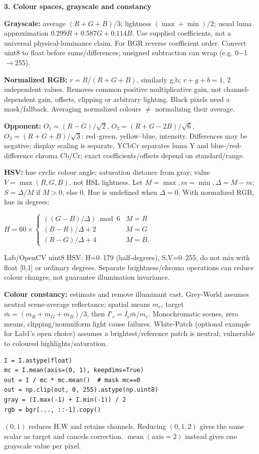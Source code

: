 \documentclass[a4paper]{article}
\newcommand{\key}[1]{\textbf{#1}}
\newcommand{\Topic}[1]{\par\vspace{1.7pt}\noindent
  {\fontsize{7.7}{8.0}\selectfont\bfseries #1}\par\vspace{0.3pt}}
\newcommand{\eq}[1]{\par\noindent\mbox{\(\displaystyle #1\)}\par}
\newcounter{sheet}
\newcounter{sheetcolumn}
\newlength{\colwidth}
\newenvironment{sheetcol}[1][7.0]{\stepcounter{sheetcolumn}
  \begin{lrbox}{\columnbox}\begin{minipage}[t]{\colwidth}\vspace{0pt}
  \fontsize{#1}{\dimexpr#1pt+0.6pt\relax}\selectfont}
  {\end{minipage}\end{lrbox}
  \typeout{CV1COL|\thesheet|\thesheetcolumn|\the\dimexpr\ht\columnbox+\dp\columnbox\relax}
  \usebox{\columnbox}\ignorespacesafterend}
\begin{document}
\begin{sheetcol}
\Topic{3. Colour spaces, grayscale and constancy}

\key{Grayscale:} average \((R+G+B)/3\); lightness \((\max+\min)/2\); usual luma approximation \(0.299R+0.587G+0.114B\). Use supplied coefficients, not a universal physical-luminance claim. For BGR reverse coefficient order. Convert uint8 to float before sums/differences; unsigned subtraction can wrap (e.g. 0\(-\)1\(\to\)255).

\key{Normalized RGB:} \(r=R/(R+G+B)\), similarly g,b; \(r+g+b=1\), 2 independent values. Removes common positive multiplicative gain, not channel-dependent gain, offsets, clipping or arbitrary lighting. Black pixels need a mask/fallback. Averaging normalized colours \(\ne\) normalizing their average.

\key{Opponent:} \(O_1=(R-G)/\sqrt2\), \(O_2=(R+G-2B)/\sqrt6\), \(O_3=(R+G+B)/\sqrt3\): red--green, yellow--blue, intensity. Differences may be negative; display scaling is separate. YCbCr separates luma Y and blue-/red-difference chroma Cb/Cr; exact coefficients/offsets depend on standard/range.

\key{HSV:} hue cyclic colour angle; saturation distance from gray; value \(V=\max(R,G,B)\), not HSL lightness. Let \(M=\max,m=\min,\Delta=M-m\); \(S=\Delta/M\) if \(M>0\), else 0. Hue is undefined when \(\Delta=0\). With normalized RGB, hue in degrees:
\eq{H=60\!\times\!\begin{cases}((G-B)/\Delta)\bmod6&M=R\\(B-R)/\Delta+2&M=G\\(R-G)/\Delta+4&M=B.\end{cases}}
Lab/OpenCV uint8 HSV: H=0--179 (half-degrees), S,V=0--255; do not mix with float [0,1] or ordinary degrees. Separate brightness/chroma operations can reduce colour changes, not guarantee illumination invariance.

\key{Colour constancy:} estimate and remove illuminant cast. Grey-World assumes neutral scene-average reflectance; spatial means \(m_c\), target \(\bar m=(m_R+m_G+m_B)/3\), then \(I'_c=I_c\bar m/m_c\). Monochromatic scenes, zero means, clipping/nonuniform light cause failures. White-Patch (optional example for Lab1's open choice) assumes a brightest/reference patch is neutral; vulnerable to coloured highlights/saturation.
\begin{lstlisting}
I = I.astype(float)
mc = I.mean(axis=(0, 1), keepdims=True)
out = I / mc * mc.mean()  # mask mc==0
out = np.clip(out, 0, 255).astype(np.uint8)
gray = (I.max(-1) + I.min(-1)) / 2
rgb = bgr[..., ::-1].copy()
\end{lstlisting}
\((0,1)\) reduces H,W and retains channels. Reducing \((0,1,2)\) gives the same scalar as target and cancels correction. \(\operatorname{mean}(\text{axis}=2)\) instead gives one grayscale value per pixel.


\end{sheetcol}
\end{document}
